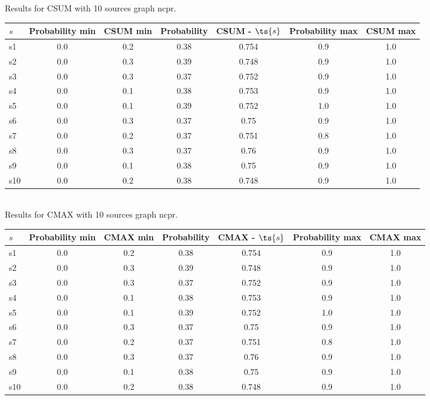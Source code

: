 \documentclass{article}
\begin{document}
\noindent Results for CSUM with 10 sources graph ncpr.

\noindent\begin{tabular}{|l|c|c|c|c|c|c|}
\hline
$s$& Probability min & CSUM min & Probability & CSUM - $\ts{s}$ & Probability max & CSUM max\\
\hline
s1 &0.0 & 0.2 & 0.38 & 0.754 & 0.9 & 1.0\\
\hline
s2 &0.0 & 0.3 & 0.39 & 0.748 & 0.9 & 1.0\\
\hline
s3 &0.0 & 0.3 & 0.37 & 0.752 & 0.9 & 1.0\\
\hline
s4 &0.0 & 0.1 & 0.38 & 0.753 & 0.9 & 1.0\\
\hline
s5 &0.0 & 0.1 & 0.39 & 0.752 & 1.0 & 1.0\\
\hline
s6 &0.0 & 0.3 & 0.37 & 0.75 & 0.9 & 1.0\\
\hline
s7 &0.0 & 0.2 & 0.37 & 0.751 & 0.8 & 1.0\\
\hline
s8 &0.0 & 0.3 & 0.37 & 0.76 & 0.9 & 1.0\\
\hline
s9 &0.0 & 0.1 & 0.38 & 0.75 & 0.9 & 1.0\\
\hline
s10 &0.0 & 0.2 & 0.38 & 0.748 & 0.9 & 1.0\\
\hline
\end{tabular}\\

\noindent Results for CMAX with 10 sources graph ncpr.

\noindent\begin{tabular}{|l|c|c|c|c|c|c|}
\hline
$s$& Probability min & CMAX min & Probability & CMAX - $\ts{s}$ & Probability max & CMAX max\\
\hline
s1 &0.0 & 0.2 & 0.38 & 0.754 & 0.9 & 1.0\\
\hline
s2 &0.0 & 0.3 & 0.39 & 0.748 & 0.9 & 1.0\\
\hline
s3 &0.0 & 0.3 & 0.37 & 0.752 & 0.9 & 1.0\\
\hline
s4 &0.0 & 0.1 & 0.38 & 0.753 & 0.9 & 1.0\\
\hline
s5 &0.0 & 0.1 & 0.39 & 0.752 & 1.0 & 1.0\\
\hline
s6 &0.0 & 0.3 & 0.37 & 0.75 & 0.9 & 1.0\\
\hline
s7 &0.0 & 0.2 & 0.37 & 0.751 & 0.8 & 1.0\\
\hline
s8 &0.0 & 0.3 & 0.37 & 0.76 & 0.9 & 1.0\\
\hline
s9 &0.0 & 0.1 & 0.38 & 0.75 & 0.9 & 1.0\\
\hline
s10 &0.0 & 0.2 & 0.38 & 0.748 & 0.9 & 1.0\\
\hline
\end{tabular}\\
\end{document}
